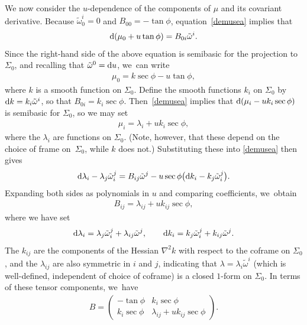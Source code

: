 \documentclass[10pt,a4paper]{amsart}
\def\wt{\tilde\omega}
\numberwithin{equation}{section}
\begin{document}
We now consider the $u$-dependence of the components of $\mu$ and its covariant derivative. Because $\wt^i_0=0$ and $B_{00}=-\tan\phi$, equation~\eqref{demusea} implies that
\begin{gather*}
{\rm d}(\mu_0 + u \tan\phi) = B_{0i} \wt^i.
\end{gather*} Since the right-hand side of the above equation is semibasic for the projection to $\Sigma_0$, and recalling that $\wt^0 = {\rm d}u$, we~can write
\begin{gather} \label{mu0eq}
\mu_0 = k\sec\phi - u \tan\phi,
\end{gather}
where $k$ is a smooth function on $\Sigma_0$. Define the smooth functions $k_i$ on $\Sigma_0$ by ${\rm d}k = k_i \wt^i$, so that $B_{0i} = k_i \sec \phi$. Then~\eqref{demusea} implies that ${\rm d}(\mu_i - u k_i \sec\phi)$ is semibasic for $\Sigma_0$, so we may set
\begin{gather*}
\mu_i = \lambda_i + u k_i \sec\phi,
\end{gather*}
where the $\lambda_i$ are functions on $\Sigma_0$. (Note, however, that these depend on the choice of frame on~$\Sigma_0$, while $k$ does not.) Substituting these into
\eqref{demusea} then gives
\begin{gather*}
{\rm d}\lambda_i -\lambda_j \wt^j_i = B_{ij} \wt^j - u\sec\phi \big({\rm d}k_i -k_j \wt^j_i\big).
\end{gather*}
Expanding both sides as polynomials in $u$ and comparing coefficients, we~obtain
\begin{gather*}
B_{ij} = \lambda_{ij}+ u k_{ij} \sec\phi,
\end{gather*}
where we have set
\begin{gather*}
{\rm d}\lambda_i = \lambda_j \wt^j_i + \lambda_{ij} \wt^j, \qquad
{\rm d}k_i = k_j\wt^j_i + k_{ij} \wt^j.
\end{gather*}
The $k_{ij}$ are the components of the Hessian $\nabla^2 k$ with respect to the coframe on $\Sigma_0$, and the $\lambda_{ij}$ are also symmetric in $i$ and $j$, indicating that $\lambda = \lambda_i \wt^i$ (which is well-defined, independent of choice of coframe) is a closed $1$-form on $\Sigma_0$. In terms of these tensor components, we~have
\begin{gather} \label{cylinderBform}
B = \begin{pmatrix} -\tan \phi & k_i \sec\phi \\ k_i \sec\phi & \lambda_{ij} + u k_{ij} \sec\phi \end{pmatrix}.
\end{gather}
\end{document}
